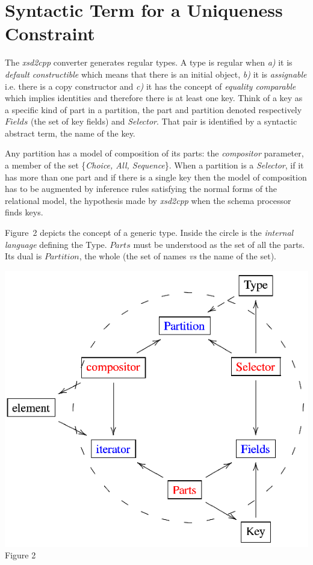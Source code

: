 \section{Syntactic Term for a Uniqueness Constraint} 
The {\it xsd2cpp} converter generates regular types. A type is regular when
{\it a)} it is  {\it default constructible} which means that there is an initial object,
{\it b)} it is {\it assignable} i.e. there is a copy constructor and 
{\it c)} it has the concept of  {\it equality comparable} which implies identities and therefore there is at least one key. Think of a  key as a specific kind of part in a partition, the part and partition denoted respectively $Fields$ (the set of key fields) and \textit{Selector}. That pair is identified by a syntactic abstract term, the name of the key.
\noindent
\begin{minipage}[h]{5.2cm}
\indent
Any partition has a model of composition of its parts: the {\it compositor} parameter, a member of the set \{\textit{Choice, All, Sequence}\}. When a partition is a \textit{Selector}, if it has more than one part and if there is a single key then the model of composition has to be augmented by inference rules satisfying the normal forms of the relational model, the hypothesis made by  {\it xsd2cpp} when the schema processor finds keys.

Figure~2 depicts the concept of a generic type. Inside the circle is the {\it internal language} defining the Type. $Parts$ must be understood as the set of all the parts. Its dual is  $Partition$, the whole (the set of names {\it vs} the name of the set). 

\end{minipage}
\begin{minipage}[h]{8.8cm}
 \begin{center}

  \includegraphics[]{part8/Viallefond_P52/P52_2.eps}
  \\Figure 2

 \end{center}
\end{minipage}
